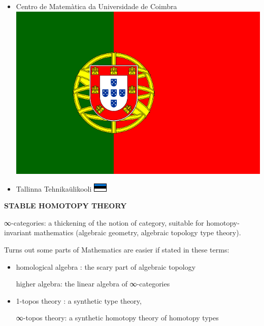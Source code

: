 \documentclass{beamer}
\begin{document}
\begin{frame}
\begin{itemize}
    \item<+-> Centro de Matemàtica da Universidade de Coimbra \includegraphics[scale=.04]{por.pdf}
    
    \item<+-> Tallinna Tehnikaülikooli \includegraphics{est.pdf}
    
  \end{itemize}
\end{frame}
%
%
%
%
%
\begin{frame}
  \Huge\centering \bfseries STABLE HOMOTOPY THEORY
\end{frame}
%
\begin{frame}
  \alert{∞-categories}: a thickening of the notion of category, suitable for homotopy-invariant mathematics (algebraic geometry, algebraic topology type theory).
  
  \onslide<+->
  Turns out some parts of Mathematics are easier if stated in these terms:
  \begin{itemize}
    \item homological algebra : the scary part of algebraic topology 
    
    {\footnotesize higher algebra: the linear algebra of ∞-categories}
    \item 1-topos theory : a synthetic type theory,
    
    {\footnotesize ∞-topos theory: a synthetic homotopy theory of homotopy types}
  \end{itemize}
\end{frame}
\end{document}
